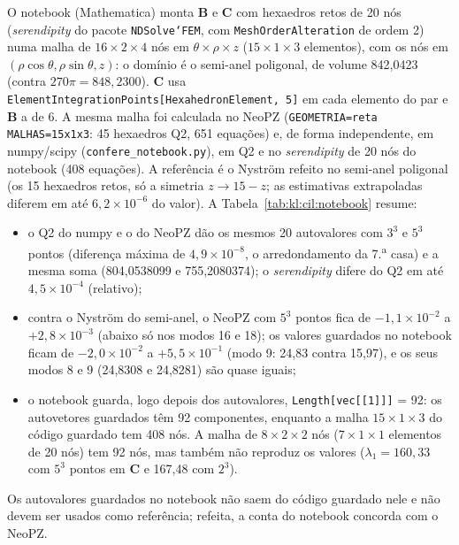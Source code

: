 \begin{sloppypar}
O notebook (Mathematica) monta $\mathbf{B}$ e $\mathbf{C}$ com hexaedros retos de 20 nós (\emph{serendipity} do
pacote \texttt{NDSolve`FEM}, com \texttt{MeshOrderAlteration} de ordem 2) numa malha de $16 \times 2 \times 4$ nós em
$\theta \times \rho \times z$ ($15 \times 1 \times 3$ elementos), com os nós em $(\rho\cos\theta, \rho\sin\theta, z)$:
o domínio é o semi-anel poligonal, de volume 842,0423 (contra $270\pi = 848{,}2300$). $\mathbf{C}$ usa
\texttt{ElementIntegrationPoints[HexahedronElement, 5]} em cada elemento do par e $\mathbf{B}$ a de 6. A mesma malha foi
calculada no NeoPZ (\texttt{GEOMETRIA=reta MALHAS=15x1x3}: 45 hexaedros Q2, 651 equações) e, de forma independente, em
numpy/scipy (\texttt{confere\_notebook.py}), em Q2 e no \emph{serendipity} de 20 nós do notebook (408 equações). A
referência é o Nyström refeito no semi-anel poligonal (os 15 hexaedros retos, só a simetria $z \to 15 - z$; as
estimativas extrapoladas diferem em até $6{,}2 \times 10^{-6}$ do valor). A Tabela~\ref{tab:kl:cil:notebook} resume:
\end{sloppypar}
\begin{itemize}
  \item o Q2 do numpy e o do NeoPZ dão os mesmos 20 autovalores com $3^3$ e $5^3$ pontos (diferença máxima de
    $4{,}9 \times 10^{-8}$, o arredondamento da 7.\textsuperscript{a} casa) e a mesma soma (804,0538099 e
    755,2080374); o \emph{serendipity} difere do Q2 em até $4{,}5 \times 10^{-4}$ (relativo);
  \item contra o Nyström do semi-anel, o NeoPZ com $5^3$ pontos fica de $-1{,}1 \times 10^{-2}$ a
    $+2{,}8 \times 10^{-3}$ (abaixo só nos modos 16 e 18); os valores guardados no notebook ficam de
    $-2{,}0 \times 10^{-2}$ a $+5{,}5 \times 10^{-1}$ (modo 9: 24,83 contra 15,97), e os seus modos 8 e 9 (24,8308 e
    24,8281) são quase iguais;
  \item o notebook guarda, logo depois dos autovalores, \texttt{Length[vec[[1]]]} = 92: os autovetores guardados têm
    92 componentes, enquanto a malha $15 \times 1 \times 3$ do código guardado tem 408 nós. A malha de
    $8 \times 2 \times 2$ nós ($7 \times 1 \times 1$ elementos de 20 nós) tem 92 nós, mas também não reproduz os
    valores ($\lambda_1 = 160{,}33$ com $5^3$ pontos em $\mathbf{C}$ e 167,48 com $2^3$).
\end{itemize}
Os autovalores guardados no notebook não saem do código guardado nele e não devem ser usados como referência; refeita,
a conta do notebook concorda com o NeoPZ.

\begin{table}[htbp]
  \centering
  \small
  \setlength{\tabcolsep}{4pt}
  \caption{Malha do notebook ($15 \times 1 \times 3$ hexaedros retos, semi-anel poligonal): referência de Nyström no
    semi-anel, Q2 do NeoPZ ($3^3$ e $5^3$ pontos em $\mathbf{C}$), Q2 do numpy ($5^3$), \emph{serendipity} de 20 nós
    (numpy, $5^3$), os valores guardados no notebook e os erros relativos contra a referência. Os autovetores guardados
    no notebook têm 92 componentes.}
  \label{tab:kl:cil:notebook}
  
\end{table}
